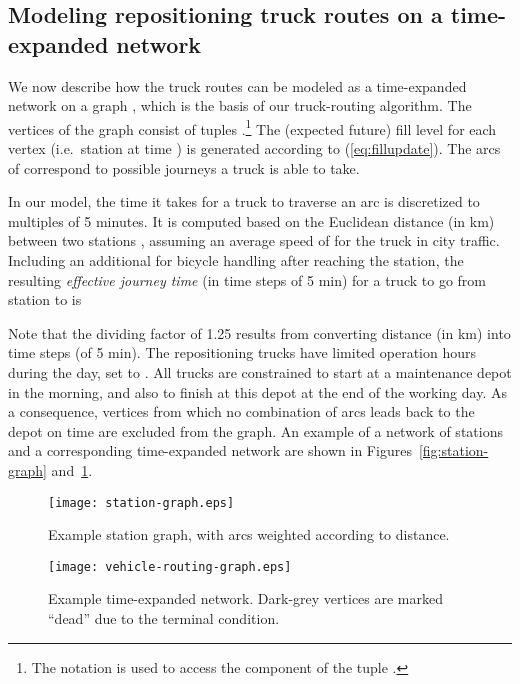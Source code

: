 \documentclass{article}
\begin{document}
\subsection{Modeling repositioning truck routes on a time-expanded network}
\label{sec:stationtime}
We now describe how the truck routes can be modeled as a time-expanded network
on a graph  \cite{kek_decision_2009,contardo_balancing_2012}, which is
the basis of our truck-routing algorithm. The vertices  of the graph consist
of tuples .\footnote{The notation  is used
  to access the component  of the tuple .} The (expected future)
fill level  for each vertex  (i.e.\ station  at time ) is generated
according to (\ref{eq:fillupdate}). The arcs  of 
correspond to possible journeys a truck is able to take.

In our model, the time it takes for a truck to traverse an arc is discretized to
multiples of 5 minutes. It is computed based on the Euclidean distance (in km)
 between two stations ,
assuming an average speed of  for the truck in city traffic.
Including an additional  for bicycle handling after reaching the
station, the resulting \emph{effective journey time} (in time steps of 5 min) for a truck to go from
station  to  is

Note that the dividing factor of 1.25 results from converting distance (in km)
into time steps (of 5 min). The repositioning trucks have limited operation
hours during the day, set to . All trucks are
constrained to start at a maintenance depot in the morning, and also to finish
at this depot at the end of the working day. As a consequence, vertices from
which no combination of arcs leads back to the depot on time are excluded from
the graph. An example of a network of stations and a corresponding time-expanded
network are shown in Figures~\ref{fig:station-graph}
and~\ref{fig:station-time-graph}.
\begin{figure}
\begin{minipage}[b]{0.45\linewidth}
\centering
\texttt{[image: station-graph.eps]}
\caption{Example station graph, with arcs weighted according to distance.}
\label{fig:station-graph}
\end{minipage}
\hfill
\begin{minipage}[b]{0.53\linewidth}
\centering
\texttt{[image: vehicle-routing-graph.eps]}
\caption{Example time-expanded network. Dark-grey vertices are marked ``dead''
  due to the terminal condition.}
\label{fig:station-time-graph}
\end{minipage}
\end{figure}
\end{document}
